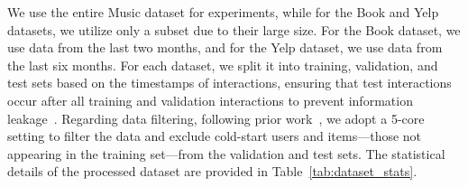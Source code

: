 


We use the entire Music dataset for experiments, while for the Book and Yelp datasets, we utilize only a subset due to their large size. For the Book dataset, we use data from the last two months, and for the Yelp dataset, we use data from the last six months.
For each dataset, we split it into training, validation, and test sets based on the timestamps of interactions, ensuring that test interactions occur after all training and validation interactions to prevent information leakage~\cite{DBLP:journals/tois/JiS0L23}.
Regarding data filtering, following prior work~\cite{liu2019nrpa}, we adopt a 5-core setting to filter the data and exclude cold-start users and items—those not appearing in the training set—from the validation and test sets. The statistical details of the processed dataset are provided in Table~\ref{tab:dataset_stats}.



